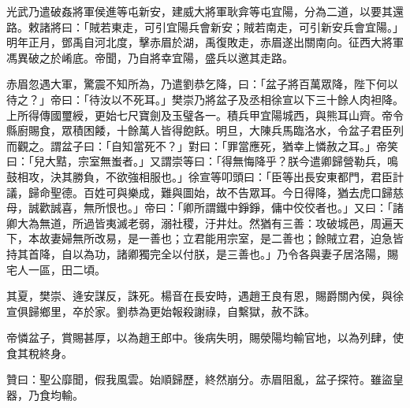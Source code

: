 \begin{pinyinscope}
光武乃遣破姦將軍侯進等屯新安，建威大將軍耿弇等屯宜陽，分為二道，以要其還路。敕諸將曰：「賊若東走，可引宜陽兵會新安；賊若南走，可引新安兵會宜陽。」明年正月，鄧禹自河北度，擊赤眉於湖，禹復敗走，赤眉遂出關南向。征西大將軍馮異破之於崤底。帝聞，乃自將幸宜陽，盛兵以邀其走路。

赤眉忽遇大軍，驚震不知所為，乃遣劉恭乞降，曰：「盆子將百萬眾降，陛下何以待之？」帝曰：「待汝以不死耳。」樊崇乃將盆子及丞相徐宣以下三十餘人肉袒降。上所得傳國璽綬，更始七尺寶劍及玉璧各一。積兵甲宜陽城西，與熊耳山齊。帝令縣廚賜食，眾積困餧，十餘萬人皆得飽飫。明旦，大陳兵馬臨洛水，令盆子君臣列而觀之。謂盆子曰：「自知當死不？」對曰：「罪當應死，猶幸上憐赦之耳。」帝笑曰：「兒大黠，宗室無蚩者。」又謂崇等曰：「得無悔降乎？朕今遣卿歸營勒兵，鳴鼓相攻，決其勝負，不欲強相服也。」徐宣等叩頭曰：「臣等出長安東都門，君臣計議，歸命聖德。百姓可與樂成，難與圖始，故不告眾耳。今日得降，猶去虎口歸慈母，誠歡誠喜，無所恨也。」帝曰：「卿所謂鐵中錚錚，傭中佼佼者也。」又曰：「諸卿大為無道，所過皆夷滅老弱，溺社稷，汙井灶。然猶有三善：攻破城邑，周遍天下，本故妻婦無所改易，是一善也；立君能用宗室，是二善也；餘賊立君，迫急皆持其首降，自以為功，諸卿獨完全以付朕，是三善也。」乃令各與妻子居洛陽，賜宅人一區，田二頃。

其夏，樊崇、逄安謀反，誅死。楊音在長安時，遇趙王良有恩，賜爵關內侯，與徐宣俱歸鄉里，卒於家。劉恭為更始報殺謝祿，自繫獄，赦不誅。

帝憐盆子，賞賜甚厚，以為趙王郎中。後病失明，賜滎陽均輸官地，以為列肆，使食其稅終身。

贊曰：聖公靡聞，假我風雲。始順歸歷，終然崩分。赤眉阻亂，盆子探符。雖盜皇器，乃食均輸。


\end{pinyinscope}